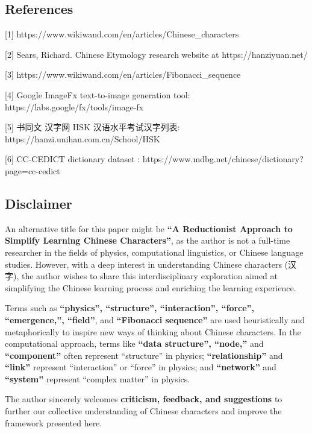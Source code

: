 \documentclass[
  11pt,
  letterpaper,
]{article}
\begin{document}
\hypertarget{references}{%
\subsection{References}\label{references}}

{[}1{]} https://www.wikiwand.com/en/articles/Chinese\_characters

{[}2{]} Sears, Richard. Chinese Etymology research website at
https://hanziyuan.net/

{[}3{]} https://www.wikiwand.com/en/articles/Fibonacci\_sequence

{[}4{]} Google ImageFx text-to-image generation tool:
https://labs.google/fx/tools/image-fx

{[}5{]} 书同文 汉字网 HSK 汉语水平考试汉字列表:
https://hanzi.unihan.com.cn/School/HSK

{[}6{]} CC-CEDICT dictionary dataset :
https://www.mdbg.net/chinese/dictionary?page=cc-cedict

\hypertarget{disclaimer}{%
\subsection{Disclaimer}\label{disclaimer}}

An alternative title for this paper might be \textbf{``A Reductionist
Approach to Simplify Learning Chinese Characters''}, as the author is
not a full-time researcher in the fields of physics, computational
linguistics, or Chinese language studies. However, with a deep interest
in understanding Chinese characters (汉字), the author wishes to share
this interdisciplinary exploration aimed at simplifying the Chinese
learning process and enriching the learning experience.

Terms such as \textbf{``physics'', ``structure'', ``interaction'',
``force'', ``emergence,'', ``field''}, and \textbf{``Fibonacci
sequence''} are used heuristically and metaphorically to inspire new
ways of thinking about Chinese characters. In the computational
approach, terms like \textbf{``data structure'', ``node,''} and
\textbf{``component''} often represent ``structure'' in physics;
\textbf{``relationship''} and \textbf{``link''} represent
``interaction'' or ``force'' in physics; and \textbf{``network''} and
\textbf{``system''} represent ``complex matter'' in physics.

The author sincerely welcomes \textbf{criticism, feedback, and
suggestions} to further our collective understanding of Chinese
characters and improve the framework presented here.
\end{document}
